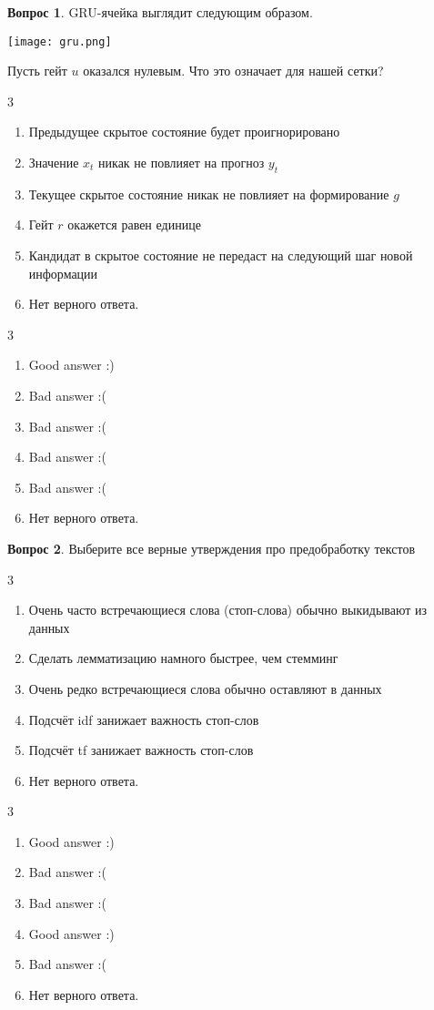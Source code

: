 \documentclass[12pt]{article}
\newenvironment{answerlist}[1][3]{
\begin{multicols}{#1}

\begin{enumerate}[label=\fbox{\emph{\Alph*}},ref=\emph{\alph*}]
}
{
\item Нет верного ответа.
\end{enumerate}
\end{multicols}
}
\theoremstyle{definition}
\newtheorem{question}{Вопрос}
\begin{document}
\begin{question}
GRU-ячейка выглядит следующим образом. 

\begin{center} 
    \texttt{[image: gru.png]} 
\end{center}

Пусть гейт $u$ оказался нулевым. Что это означает для нашей сетки? 
\begin{answerlist}
  \item Предыдущее скрытое состояние будет проигнорировано
  \item Значение $x_t$ никак не повлияет на прогноз $y_t$ 
  \item Текущее скрытое состояние никак не повлияет на формирование $g$
  \item Гейт $r$ окажется равен единице
  \item Кандидат в скрытое состояние не передаст на следующий шаг новой информации
\end{answerlist}
\end{question}

\begin{solution}
\begin{answerlist}
  \item Good answer :)
  \item Bad answer :(
  \item Bad answer :(
  \item Bad answer :(
  \item Bad answer :(
\end{answerlist}
\end{solution}



\begin{question}
Выберите все верные утверждения про предобработку текстов
\begin{answerlist}
  \item Очень часто встречающиеся слова (стоп-слова) обычно выкидывают из данных
  \item Сделать лемматизацию намного быстрее, чем стемминг 
  \item Очень редко встречающиеся слова обычно оставляют в данных
  \item Подсчёт idf занижает важность стоп-слов
  \item Подсчёт tf занижает важность стоп-слов
\end{answerlist}
\end{question}

\begin{solution}
\begin{answerlist}
  \item Good answer :)
  \item Bad answer :(
  \item Bad answer :(
  \item Good answer :)
  \item Bad answer :(
\end{answerlist}
\end{solution}
\end{document}

